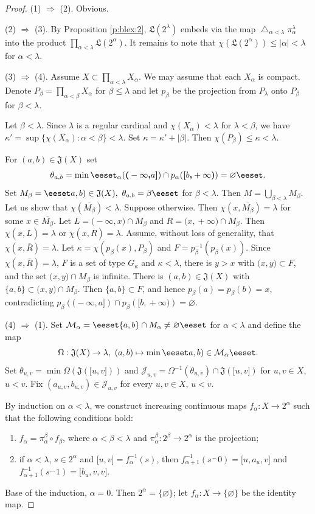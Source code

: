 \documentclass[10pt,a4paper]{amsart}
\def\B{2}
\def\Om{\Omega}
\def\al{\alpha}
\def\bbset#1:#2\eeset{\{#1\,:\,#2\}}
\def\be{\beta}
\def\cJ{{\mathcal J}}
\def\cM{{\mathcal M}}
\def\cl#1{\overline{#1}}
\def\diag{\mathop{\bigtriangleup}}
\def\es{\varnothing}
\def\fun{{}^\frown}
\def\ilcc[#1,#2]{\ilsymlc#1\ilcomma/ #2\ilsymrc}
\def\ilcomma/{\boldsymbol{,}}
\def\ilcp[#1,#2){\ilsymlc#1\ilcomma/ #2\ilsymrp}
\def\ilpc(#1,#2]{\ilsymlp#1\ilcomma/ #2\ilsymrc}
\def\ilpp(#1,#2){\ilsymlp#1\ilcomma/ #2\ilsymrp}
\def\ilsymlc{\boldsymbol{[}}
\def\ilsymlp{\boldsymbol{(}}
\def\ilsymrc{\boldsymbol{]}}
\def\ilsymrp{\boldsymbol{)}}
\def\jumps#1{\mathfrak{J}(#1)}
\def\ka{\kappa}
\def\la{\lambda}
\def\lex#1#2{\mathfrak{L}(#2^{#1})}
\def\lexab{\lex\la\B}
\def\rarr{\Rightarrow}
\def\set#1{\bbset#1\eeset}
\def\sset#1{\{#1\}}
\def\te{\theta}
\begin{document}
\begin{proof}
(1) $\rarr$ (2). Obvious.

(2) $\rarr$ (3). By Proposition \ref{p:blex:2}, $\lexab$ embeds via the map $\diag_{\al<\la} \pi_\al^\la$ into the product $\prod_{\al<\la} \lex\al\B$. It remains to note that $\chi(\lex\al\B)\leq |\al|<\la$ for $\al<\la$.

(3) $\rarr$ (4). Assume $X\subset \prod_{\al<\la}X_\al$. We may assume that each $X_\al$ is compact. Denote $P_\be = \prod_{\al<\be}X_\al$ for $\be\leq\la$ and let $p_\be$ be the projection from $P_\la$ onto $P_\be$ for $\be<\la$.

Let $\be<\la$. Since $\la$ is a regular cardinal and $\chi(X_\al)<\la$ for $\la<\be$, we have $\ka'=\sup\{ \chi(X_\al) : \al < \be \}<\la$. Set $\ka=\ka' + |\be|$. Then $\chi(P_\be)\leq\ka<\la$.

For $(a,b)\in\jumps X$ set
\[
\te_{a,b}=\min \set{\al<\la: p_\al(\ilpc(-\infty,a]) \cap  p_\al(\ilcp[b,+\infty))=\es}.
\]
Set $M_\be=\set{a,b : (a,b)\in\jumps X,\ \te_{a,b}=\be}$ for $\be<\la$. Then $M=\bigcup_{\be<\la} M_\be$. Let us show that $\chi(\cl{M_\be})<\la$. Suppose otherwise. Then $\chi(x,\cl{M_\be})=\la$ for some $x\in \cl{M_\be}$. Let $L=\ilpp(-\infty,x)\cap M_\be$ and $R=\ilpp(x,+\infty)\cap M_\be$. Then $\chi(x,\cl{L})=\la$ or $\chi(x,\cl{R})=\la$. Assume, without loss of generality, that $\chi(x,\cl{R})=\la$. Let $\ka=\chi(p_\be(x), P_\be)$ and $F=p_\be^{-1}(p_\be(x))$. Since $\chi(x,\cl{R})=\la$, $F$ is a set of type $G_\ka$ and $\ka<\la$, there is $y>x$ with $\ilpp(x,y)\subset F$, and the set $\ilpp(x,y)\cap M_\be$ is infinite. There is $(a,b)\in\jumps X$ with $\sset{a,b}\subset \ilpp(x,y)\cap M_\be$. Then $\sset{a,b}\subset F$, and hence $p_\be(a)=p_\be(b)=x$, contradicting $p_\be(\ilpc(-\infty,a]) \cap  p_\be(\ilcp[b,+\infty))=\es$.

(4) $\rarr$ (1). Set $\cM_\al=\set{(a,b)\in \jumps X: \sset{a,b}\cap M_\al\neq\es}$ for $\al<\la$ and define the map
\[
\Om: \jumps X \to \la,\ (a,b) \mapsto \min\set{\al<\la: (a,b)\in \cM_\al}.
\]
Set $\te_{u,v}=\min  \Om(\jumps{\ilcc[u,v]})$ and $\cJ_{u,v}=\Om^{-1}(\te_{u,v})\cap \jumps{\ilcc[u,v]}$ for $u,v\in X$, $u<v$. Fix $(a_{u,v},b_{u,v})\in \cJ_{u,v}$ for every $u,v\in X$, $u<v$.

By induction on $\al<\la$, we construct increasing continuous maps $f_\al: X\to \B^\al$ such that the following conditions hold:
\begin{enumerate}
\item
$f_\al=\pi_\al^\be\circ f_\be$, where $\al<\be<\la$ and $\pi_\al^\be: \B^\be\to \B^\al$ is the projection;
\item
if $\al<\la$, 
$s\in \B^\al$ and $\ilcc[u,v]=f^{-1}_\al(s)$, then $f^{-1}_{\al+1}(s\fun 0)=\ilcc[u,a_{u,v}]$ and $f^{-1}_{\al+1}(s\fun 1)=\ilcc[b_{u,v},v]$.
\end{enumerate}
Base of the induction, $\al=0$. Then $\B^\al=\sset\es$; let $f_\al: X\to \sset\es$ be the identity map.


\end{proof}
\end{document}
